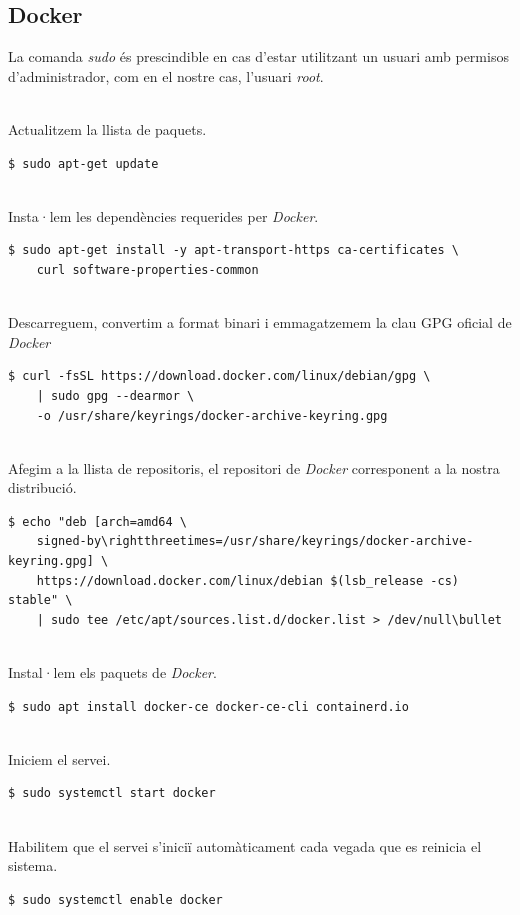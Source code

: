 \clearpage
\subsection*{\gls{Docker}}\label{subsec:docker-installation}

\begin{tcolorbox}[colback=red!5!white, colframe=red!75!black, title=sudo]
    La comanda \textit{sudo} és prescindible en cas d'estar utilitzant un usuari amb permisos d'administrador, com en el nostre cas, l'usuari \textit{root}.
\end{tcolorbox}

\noindent \\
Actualitzem la llista de paquets.
\begin{verbatim}
$ sudo apt-get update
\end{verbatim}

\noindent \\
Insta·lem les dependències requerides per \textit{\gls{Docker}}.
\begin{verbatim}
$ sudo apt-get install -y apt-transport-https ca-certificates \
    curl software-properties-common
\end{verbatim}

\noindent \\
Descarreguem, convertim a format binari i emmagatzemem la clau GPG oficial de \textit{\gls{Docker}}
\begin{verbatim}
$ curl -fsSL https://download.docker.com/linux/debian/gpg \
    | sudo gpg --dearmor \
    -o /usr/share/keyrings/docker-archive-keyring.gpg
\end{verbatim}

\noindent \\
Afegim a la llista de repositoris, el repositori de \textit{\gls{Docker}} corresponent a la nostra distribució.
\begin{verbatim}
$ echo "deb [arch=amd64 \
    signed-by\rightthreetimes=/usr/share/keyrings/docker-archive-keyring.gpg] \
    https://download.docker.com/linux/debian $(lsb_release -cs) stable" \
    | sudo tee /etc/apt/sources.list.d/docker.list > /dev/null\bullet
\end{verbatim}

\clearpage

\noindent \\
Instal·lem els paquets de \textit{\gls{Docker}}.
\begin{verbatim}
$ sudo apt install docker-ce docker-ce-cli containerd.io
\end{verbatim}

\noindent \\
Iniciem el servei.
\begin{verbatim}
$ sudo systemctl start docker
\end{verbatim}

\noindent \\
Habilitem que el servei s'iniciï automàticament cada vegada que es reinicia el sistema.
\begin{verbatim}
$ sudo systemctl enable docker
\end{verbatim}
